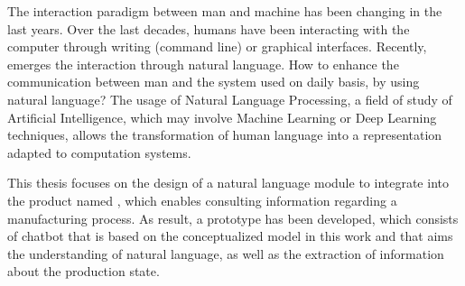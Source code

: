\begin{abstractotherlanguage}
The interaction paradigm between man and machine has been changing in the last years. Over the last decades, humans have been interacting with the computer through writing (command line) or graphical interfaces. Recently, emerges the interaction through natural language. How to enhance the communication between man and the system used on daily basis, by using natural language? The usage of Natural Language Processing, a field of study of Artificial Intelligence, which may involve Machine Learning or Deep Learning techniques, allows the transformation of human language into a representation adapted to computation systems.

This thesis focuses on the design of a natural language module to integrate into the product named {\productname}, which enables consulting information regarding a manufacturing process. As result, a prototype has been developed, which consists of chatbot that is based on the conceptualized model in this work and that aims the understanding of natural language, as well as the extraction of information about the production state.

\end{abstractotherlanguage}